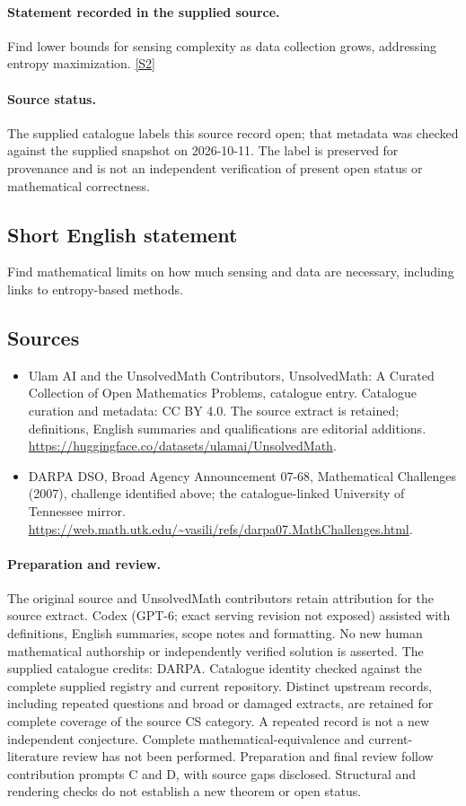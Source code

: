\documentclass[11pt]{article}
\begin{document}
\paragraph{Statement recorded in the supplied source.}
Find lower bounds for sensing complexity as data collection grows, addressing entropy maximization. \href{https://web.math.utk.edu/~vasili/refs/darpa07.MathChallenges.html}{[S2]}
\paragraph{Source status.}
The supplied catalogue labels this source record open; that metadata was checked against the supplied snapshot on 2026-10-11. The label is preserved for provenance and is not an independent verification of present open status or mathematical correctness.
\subsection{Short English statement}
Find mathematical limits on how much sensing and data are necessary, including links to entropy-based methods.
\subsection{Sources}
\begin{itemize}
\item[S1] Ulam AI and the UnsolvedMath Contributors, UnsolvedMath: A Curated Collection of Open Mathematics Problems, catalogue entry. Catalogue curation and metadata: CC BY 4.0. The source extract is retained; definitions, English summaries and qualifications are editorial additions.
\url{https://huggingface.co/datasets/ulamai/UnsolvedMath}.
\item[S2] DARPA DSO, Broad Agency Announcement 07-68, Mathematical Challenges (2007), challenge identified above; the catalogue-linked University of Tennessee mirror.
\url{https://web.math.utk.edu/~vasili/refs/darpa07.MathChallenges.html}.
\end{itemize}
\paragraph{Preparation and review.}
The original source and UnsolvedMath contributors retain attribution for the source extract. Codex (GPT-6; exact serving revision not exposed) assisted with definitions, English summaries, scope notes and formatting. No new human mathematical authorship or independently verified solution is asserted. The supplied catalogue credits: DARPA. Catalogue identity checked against the complete supplied registry and current repository. Distinct upstream records, including repeated questions and broad or damaged extracts, are retained for complete coverage of the source CS category. A repeated record is not a new independent conjecture. Complete mathematical-equivalence and current-literature review has not been performed. Preparation and final review follow contribution prompts C and D, with source gaps disclosed. Structural and rendering checks do not establish a new theorem or open status.
\label{end:statement}
\end{document}
